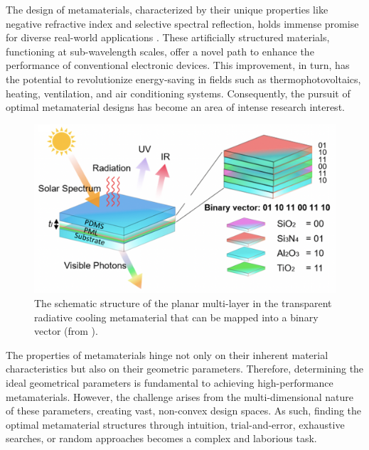 The design of metamaterials, characterized by their unique properties like negative refractive index and selective spectral reflection, holds immense promise for diverse real-world applications \cite{doi:10.1126/science.1096796,10.1038/natrevmats.2016.1,10.1038/natrevmats.2017.66,10.1038/s41928-019-0257-7}. These artificially structured materials, functioning at sub-wavelength scales, offer a novel path to enhance the performance of conventional electronic devices. This improvement, in turn, has the potential to revolutionize energy-saving in fields such as thermophotovoltaics, heating, ventilation, and air conditioning systems. Consequently, the pursuit of optimal metamaterial designs has become an area of intense research interest.

\begin{figure}
\includegraphics[width=\columnwidth]{groups/2._Use_case_discovery/metamaterial-fig.png}
\caption{The schematic structure of the planar multi-layer in the transparent radiative cooling metamaterial that can be mapped into a binary vector (from \cite{10.1021/acsenergylett.2c01969}).}
\label{fig:metamaterial}
\end{figure}

The properties of metamaterials hinge not only on their inherent material characteristics but also on their geometric parameters. Therefore, determining the ideal geometrical parameters is fundamental to achieving high-performance metamaterials. However, the challenge arises from the multi-dimensional nature of these parameters, creating vast, non-convex design spaces. As such, finding the optimal metamaterial structures through intuition, trial-and-error, exhaustive searches, or random approaches becomes a complex and laborious task.

